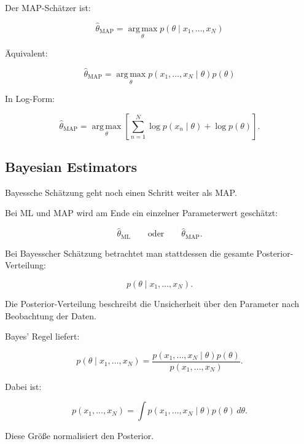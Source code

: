 \documentclass[11pt,a4paper]{scrartcl}
\begin{document}
\begin{answerbox}
    Der MAP-Schätzer ist:

    \[
        \boxed{
            \hat\theta_{\mathrm{MAP}}
            =
            \operatorname*{arg\,max}_{\theta}
            p(\theta \mid x_1,\dots,x_N)
        }
    \]

    Äquivalent:

    \[
        \boxed{
            \hat\theta_{\mathrm{MAP}}
            =
            \operatorname*{arg\,max}_{\theta}
            p(x_1,\dots,x_N \mid \theta)p(\theta)
        }
    \]

    In Log-Form:

    \[
        \boxed{
            \hat\theta_{\mathrm{MAP}}
            =
            \operatorname*{arg\,max}_{\theta}
            \left[
                \sum_{n=1}^{N}
                \log p(x_n \mid \theta)
                +
                \log p(\theta)
            \right].
        }
    \]
\end{answerbox}

\subsection{Bayesian Estimators}

\begin{notebox}
    Bayessche Schätzung geht noch einen Schritt weiter als MAP.

    Bei ML und MAP wird am Ende ein einzelner Parameterwert geschätzt:

    \[
        \hat\theta_{\mathrm{ML}}
        \qquad \text{oder} \qquad
        \hat\theta_{\mathrm{MAP}}.
    \]

    Bei Bayesscher Schätzung betrachtet man stattdessen die gesamte
    Posterior-Verteilung:

    \[
        p(\theta \mid x_1,\dots,x_N).
    \]
\end{notebox}

\begin{solutionbox}
    Die Posterior-Verteilung beschreibt die Unsicherheit über den Parameter nach
    Beobachtung der Daten.

    Bayes' Regel liefert:

    \[
        p(\theta \mid x_1,\dots,x_N)
        =
        \frac{
            p(x_1,\dots,x_N \mid \theta)p(\theta)
        }{
            p(x_1,\dots,x_N)
        }.
    \]

    Dabei ist:

    \[
        p(x_1,\dots,x_N)
        =
        \int
        p(x_1,\dots,x_N \mid \theta)p(\theta)
        \,d\theta.
    \]

    Diese Größe normalisiert den Posterior.
\end{solutionbox}
\end{document}
